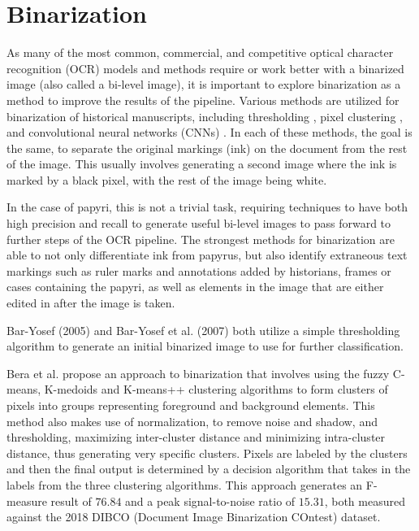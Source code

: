 \section{Binarization}
As many of the most common, commercial, and competitive optical character recognition (OCR) models and methods require or work better with a binarized image \cite{Gupta, SmithTesseract, SmithLines, Bar-Yosef2005, Bar-Yosef2007} (also called a bi-level image), it is important to explore binarization as a method to improve the results of the pipeline.
Various methods are utilized for binarization of historical manuscripts, including thresholding \cite{Bar-Yosef2005, Bar-Yosef2007}, pixel clustering \cite{Bera}, and convolutional neural networks (CNNs) \cite{Dhali2019, Dhali2020, Xiong}. In each of these methods, the goal is the same, to separate the original markings (ink) on the document from the rest of the image. This usually involves generating a second image where the ink is marked by a black pixel, with the rest of the image being white.

In the case of papyri, this is not a trivial task, requiring techniques to have both high precision and recall to generate useful bi-level images to pass forward to further steps of the OCR pipeline. The strongest methods for binarization are able to not only differentiate ink from papyrus, but also identify extraneous text markings such as ruler marks and annotations added by historians, frames or cases containing the papyri, as well as elements in the image that are either edited in after the image is taken.

Bar-Yosef (2005)\cite{Bar-Yosef2005} and Bar-Yosef et al. (2007)\cite{Bar-Yosef2005} both utilize a simple thresholding algorithm to generate an initial binarized image to use for further classification.

Bera et al.\cite{Bera} propose an approach to binarization that involves using the fuzzy C-means, K-medoids and K-means++ clustering algorithms to form clusters of pixels into groups representing foreground and background elements. This method also makes use of normalization, to remove noise and shadow, and thresholding, maximizing inter-cluster distance and minimizing intra-cluster distance, thus generating very specific clusters. Pixels are labeled by the clusters and then the final output is determined by a decision algorithm that takes in the labels from the three clustering algorithms. This approach generates an F-measure result of $76.84$ and a peak signal-to-noise ratio of $15.31$, both measured against the 2018 DIBCO (Document Image Binarization COntest) dataset\cite{DIBCO2018}.

